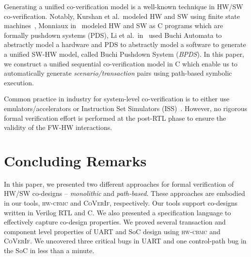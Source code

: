 \documentclass[sigconf]{acmart}
\newcommand{\tool}[1]{\textsc{#1}\xspace}
\newcommand{\hwcbmcv}{\tool{hw-cbmc}}
\newcommand{\verifox}{\tool{CoVerIf}}
\newcommand{\Omit}[1]{}
\begin{document}
Generating a unified co-verification model is a well-known 
technique in HW/SW co-verification.  Notably, Kurshan et al.~modeled HW and 
SW using finite state machines~\cite{fmsd02}, Monniaux in~\cite{emsoft07} modeled
HW and SW as C programs which are formally pushdown systems (PDS), 
Li et al.~in~\cite{fase10} used Buchi Automata to abstractly
model a hardware and PDS to abstractly model a software to generate a unified SW-HW model, 
called Buchi Pushdown System ({\em BPDS}).  In this paper, we construct a unified 
sequential co-verification model in C which enable us to automatically 
generate {\em scenario/transaction} pairs using path-based symbolic execution. 

\Omit{
A system is comprised of a set of concurrent FW and HW models, which
interleave asynchronously.  Malik et al.~in~\cite{hvc} showed 
that these patterns are meaningful in further
settings -- a Linux device driver interacting with x86 QEMU emulator code or
a Rockbox firmware interacting with an iAudio X5 device.  Practical industrial 
co-designs, such as IBM Text Accelerator co-design~\cite{polig2014micro,polig2014fpl} 
and IBM coherent FFT coprocessor~\cite{giefers2015accelerating} also exhibits
producer-consumer interaction pattern. 
}
Common practice in industry for system-level co-verification is to 
either use emulators/accelerators or Instruction Set Simulators 
(ISS)~\cite{coverif-book}.  However, no rigorous formal verification 
effort is performed at the post-RTL phase to ensure the validity of the
FW-HW interactions.  

\Omit{
The concept of symbolic execution~\cite{DBLP:journals/tse/Clarke76,
DBLP:conf/pldi/GodefroidKS05, DBLP:conf/osdi/CadarDE08} is prevalent in the
software domain for automated test generation as well as bug finding.  This
technique is different from the symbolic simulation techniques that are used
in the hardware domain.  In this paper, we apply path-wise symbolic execution
to mine relevant scenario/transaction pairs for effective co-verification of 
a unified co-verification model.  
}
\section{Concluding Remarks}
%
In this paper, we presented two different approaches for formal verification of 
HW/SW co-designs -- \emph{monolithic} and \emph{path-based}.  These approaches are 
embodied in our tools, \hwcbmcv and \verifox, respectively.  Our tools support 
co-designs written in Verilog RTL and C.  We also presented a specification language to 
effectively capture co-design properties.  
We proved several transaction and component level properties of UART and SoC
design using \hwcbmcv and \verifox.  
We uncovered three critical bugs in UART and one control-path bug in the SoC in 
less than a minute. 
\end{document}
